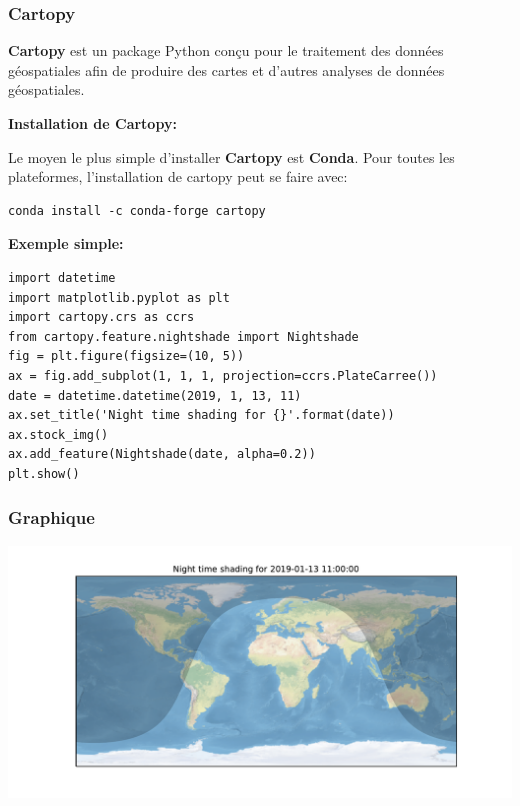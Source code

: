 \documentclass{beamer}
\begin{document}
\begin{frame}
\frametitle{Cartopy}

\textbf{Cartopy} est un package Python conçu pour le traitement des données géospatiales afin de produire des cartes et d’autres analyses de données géospatiales.

\textbf{Installation de Cartopy:}

Le moyen le plus simple d’installer \textbf{Cartopy} est \textbf{Conda}. Pour toutes les plateformes, l’installation de cartopy peut se faire avec:
\begin{verbatim}
conda install -c conda-forge cartopy
\end{verbatim}

\textbf{Exemple simple:}

\begin{verbatim}
import datetime
import matplotlib.pyplot as plt
import cartopy.crs as ccrs
from cartopy.feature.nightshade import Nightshade
fig = plt.figure(figsize=(10, 5))
ax = fig.add_subplot(1, 1, 1, projection=ccrs.PlateCarree())
date = datetime.datetime(2019, 1, 13, 11)
ax.set_title('Night time shading for {}'.format(date))
ax.stock_img()
ax.add_feature(Nightshade(date, alpha=0.2))
plt.show()
\end{verbatim}


\end{frame}

\begin{frame}
\frametitle{Graphique}

\vspace{6mm}

\centerline{\includegraphics[width=1.2\linewidth]{figs/cartopy1.pdf}}

\vspace{6mm}
\end{frame}
\end{document}
